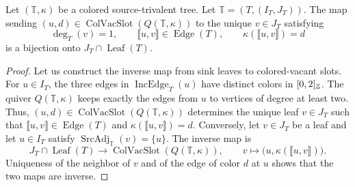 \begin{lemma}\label{lem:vacant-slots}

Let $(\mathbb T,\kappa)$ be a colored source-trivalent tree.
Let $\mathbb T=(T,(I_T,J_T))$.
The map sending $(u,d)\in\operatorname{ColVacSlot}(Q(\mathbb T,\kappa))$ to the unique $v\in J_T$ satisfying
\[
 \deg_T(v)=1,\qquad \llbracket u,v\rrbracket\in\operatorname{Edge}(T),\qquad
 \kappa(\llbracket u,v\rrbracket)=d
\]
is a bijection onto $J_T\cap\operatorname{Leaf}(T)$.
\end{lemma}
\begin{proof}
Let us construct the inverse map from sink leaves to colored-vacant slots.
For $u\in I_{T}$, the three edges in $\operatorname{IncEdge}_T(u)$
have distinct colors in $[0,2]_{\mathbb Z}$.
The quiver $Q(\mathbb T,\kappa)$ keeps exactly the edges from $u$ to vertices of degree at least two.
Thus, $(u,d)\in\operatorname{ColVacSlot}(Q(\mathbb T,\kappa))$ determines the unique leaf
$v\in J_{T}$ such that $\llbracket u,v\rrbracket\in\operatorname{Edge}(T)$
and $\kappa(\llbracket u,v\rrbracket)=d$.
Conversely, let $v\in J_T$ be a leaf and let $u\in I_T$ satisfy $\operatorname{SrcAdj}_{\mathbb T}(v)=\{u\}$.
The inverse map is
\[
 J_T\cap\operatorname{Leaf}(T)\longrightarrow\operatorname{ColVacSlot}(Q(\mathbb T,\kappa)),
 \qquad v\longmapsto\bigl(u,\kappa(\llbracket u,v\rrbracket)\bigr).
\]
Uniqueness of the neighbor of $v$ and of the edge of color $d$ at $u$ shows that the two maps are inverse.
\end{proof}

